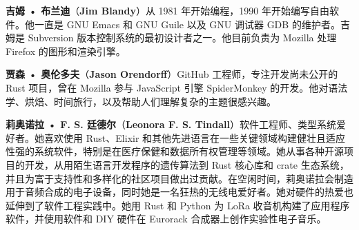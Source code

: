 
\textbf{吉姆 • 布兰迪}（\textbf{Jim Blandy}）从 1981 年开始编程，1990 年开始编写自由软件。他一直是 GNU Emacs 和 GNU Guile 以及 GNU 调试器 GDB 的维护者。吉姆是 Subversion 版本控制系统的最初设计者之一。他目前负责为 Mozilla 处理 Firefox 的图形和渲染引擎。

\textbf{贾森 • 奥伦多夫}（\textbf{Jason Orendorff}）GitHub 工程师，专注开发尚未公开的 Rust 项目，曾在 Mozilla 参与 JavaScript 引擎 SpiderMonkey 的开发。他对语法学、烘焙、时间旅行，以及帮助人们理解复杂的主题很感兴趣。

\textbf{莉奥诺拉 • F. S. 廷德尔}（\textbf{Leonora F. S. Tindall}）软件工程师、类型系统爱好者。她喜欢使用 Rust、Elixir 和其他先进语言在一些关键领域构建健壮且适应性强的系统软件，特别是在医疗保健和数据所有权管理等领域。她从事各种开源项目的开发，从用陌生语言开发程序的遗传算法到 Rust 核心库和 crate 生态系统，并且为富于支持性和多样化的社区项目做出过贡献。在空闲时间，莉奥诺拉会制造用于音频合成的电子设备，同时她是一名狂热的无线电爱好者。她对硬件的热爱也延伸到了软件工程实践中。她用 Rust 和 Python 为 LoRa 收音机构建了应用程序软件，并使用软件和 DIY 硬件在 Eurorack 合成器上创作实验性电子音乐。

